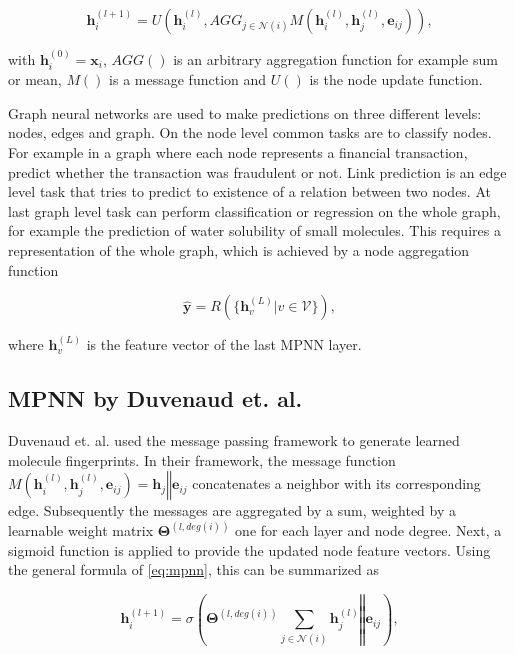 \begin{equation}
	\label{eq:mpnn}
	\pmb{h}^{(l + 1)}_i = U\left(\pmb{h}^{(l)}_i, AGG_{j \in \mathcal{N}(i)} M\left(\pmb{h}^{(l)}_i, \pmb{h}^{(l)}_j, \pmb{e}_{ij}\right)\right),
\end{equation}

with $\pmb{h}^{(0)}_i = \pmb{x}_i$, $AGG()$ is an arbitrary aggregation function
for example sum or mean, $M()$ is a message function and $U()$ is the node update function.

Graph neural networks are used to make predictions on three different levels:
nodes, edges and graph. On the node level common tasks are to classify nodes.
For example in a graph where each node represents a financial transaction, predict
whether the transaction was fraudulent or not. Link prediction is an edge level
task that tries to predict to existence of a relation between two nodes. At last
graph level task can perform classification or regression on the whole graph, for
example the prediction of water solubility of small molecules.\cite{wu2020comprehensive}
This requires a representation of the whole graph, which is achieved by a node
aggregation function\cite{gilmer2017neural}

\begin{equation}
	\hat{\pmb{y}} = R(\{\pmb{h}^{(L)}_v | v \in \mathcal{V}\}),
\end{equation}


where $\pmb{h}^{(L)}_v$ is the feature vector of the last MPNN layer.


\subsection{MPNN by Duvenaud et. al.}

Duvenaud et. al. used the message passing framework to generate learned molecule
fingerprints.\cite{duvenaud2015convolutional} In their framework, the message function
$M\left(\pmb{h}^{(l)}_i, \pmb{h}^{(l)}_j, \pmb{e}_{ij}\right) = \pmb{h}_j \mathbin\Vert \pmb{e}_{ij}$
concatenates a neighbor with its corresponding edge. Subsequently the messages are
aggregated by a sum, weighted by a learnable weight matrix $\pmb{\Theta}^{(l, deg(i))}$
one for each layer and node degree. Next, a sigmoid function is applied to provide
the updated node feature vectors. Using the general formula of \cref{eq:mpnn}, this
can be summarized as

\begin{equation}
	\pmb{h}^{(l + 1)}_i = \sigma\left( \pmb{\Theta}^{(l, deg(i))} \sum_{j \in \mathcal{N}(i)}
	\pmb{h}^{(l)}_j \mathbin\Vert \pmb{e}_{ij}\right),
\end{equation}



